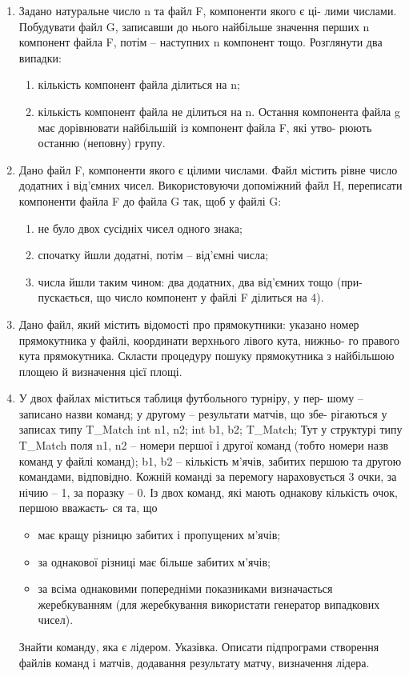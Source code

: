 \documentclass[]{article}
\makeatletter
\newcommand{\xslalph}[1]{\expandafter\@xslalph\csname c@#1\endcsname}
\newcommand{\@xslalph}[1]{%
    \ifcase#1\or а\or б\or в\or г\or д\or e\or є\or ж\or з\or i%
    \or й\or к\or л\or м\or н\or о\or п\or р\or с\or т%
    \or у\or ф\or х\or ц\or ч\or ш\or ю\or я\or аа\or бб\or вв %
    \else\@ctrerr\fi%
}
\makeatother
\begin{document}
\begin{enumerate}
\item  Задано натуральне число n  та файл F,  компоненти якого є ці-
лими  числами.  Побудувати  файл  G,  записавши  до  нього  найбільше 
значення перших n компонент файла F, потім – наступних n компонент 
тощо. Розглянути два випадки:
\begin{enumerate}[label=\xslalph*)]
\item кількість компонент файла ділиться на n; 
\item кількість компонент файла не ділиться на n. Остання компонента 
файла  g має  дорівнювати  найбільшій  із  компонент файла F,  які  утво-
рюють останню (неповну) групу. 
\end{enumerate}
\item  Дано файл F, компоненти якого є цілими числами. Файл містить 
рівне число додатних і від'ємних чисел. Використовуючи допоміжний файл 
H, переписати компоненти файла F до файла G так, щоб у файлі G: 
\begin{enumerate}[label=\xslalph*)]
\item не було двох сусідніх чисел одного знака; 
\item спочатку йшли додатні, потім – від'ємні числа; 
\item числа йшли таким чином: два додатних, два від'ємних тощо (при-
пускається, що число компонент у файлі F ділиться на 4).
\end{enumerate}
\item  Дано файл,  який  містить  відомості  про  прямокутники:  указано 
номер прямокутника у файлі, координати верхнього лівого кута, нижньо-
го правого кута прямокутника. Скласти процедуру пошуку прямокутника 
з найбільшою площею й визначення цієї площі.
\item
 У двох файлах міститься  таблиця футбольного  турніру, у пер-
шому – записано назви команд; у другому – результати матчів, що збе-
рігаються у записах типу T\_Match 
{ 
  int n1, n2;    int b1, b2; 
} T\_Match; 
Тут  у  структурі  типу  T\_Match  поля  n1,  n2 –  номери  першої  і  другої 
команд (тобто номери назв команд у файлі команд); b1, b2 – кількість 
м'ячів, забитих першою та другою командами, відповідно. 
Кожній  команді  за перемогу нараховується 3 очки,  за  нічию – 1,  за 
поразку – 0. 
Із двох команд, які мають однакову кількість очок, першою вважаєть-
ся та, що 
\begin{itemize}
\item   має кращу різницю забитих і пропущених м'ячів; 
\item   за однакової різниці має більше забитих м'ячів; 
\item   за всіма однаковими попередніми показниками визначається жеребкуванням 
(для жеребкування використати генератор випадкових чисел). 
\end{itemize}
Знайти команду, яка є лідером. 
Указівка.  Описати  підпрограми  створення  файлів  команд  і  матчів, 
додавання результату матчу, визначення лідера.
\end{enumerate}
\end{document}
